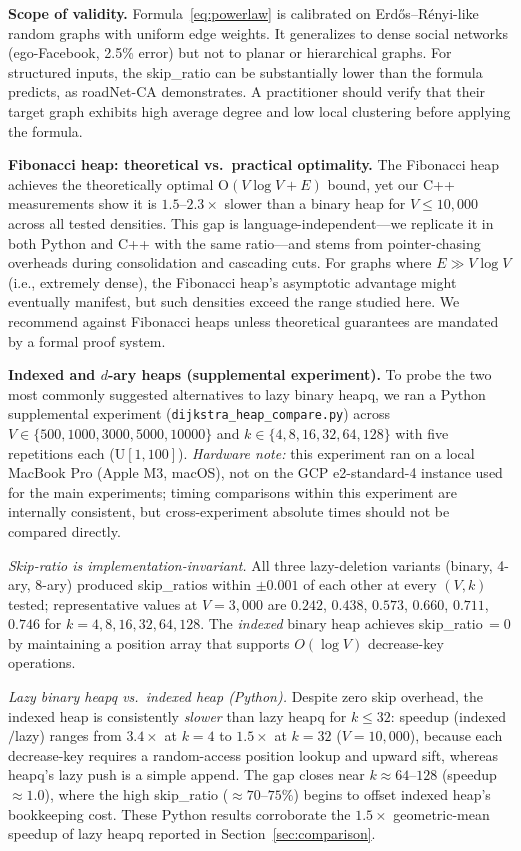 \documentclass[conference]{IEEEtran}
\begin{document}
\noindent\textbf{Scope of validity.}
Formula~\eqref{eq:powerlaw} is calibrated on Erd\H{o}s--R\'enyi-like
random graphs with uniform edge weights.  It generalizes to dense social
networks (ego-Facebook, 2.5\% error) but not to planar or hierarchical
graphs.  For structured inputs, the skip\_ratio can be substantially
lower than the formula predicts, as roadNet-CA demonstrates.  A
practitioner should verify that their target graph exhibits high average
degree and low local clustering before applying the formula.

\noindent\textbf{Fibonacci heap: theoretical vs.\ practical optimality.}
The Fibonacci heap achieves the theoretically optimal O$(V\log V + E)$
bound, yet our C++ measurements show it is $1.5$--$2.3\times$ slower
than a binary heap for $V\leq 10{,}000$ across all tested densities.
This gap is language-independent---we replicate it in both Python and C++
with the same ratio---and stems from pointer-chasing overheads during
consolidation and cascading cuts.  For graphs where $E\gg V\log V$
(i.e., extremely dense), the Fibonacci heap's asymptotic advantage might
eventually manifest, but such densities exceed the range studied here.
We recommend against Fibonacci heaps unless theoretical guarantees are
mandated by a formal proof system.

\noindent\textbf{Indexed and $d$-ary heaps (supplemental experiment).}
\label{sec:heapcompare}
To probe the two most commonly suggested alternatives to lazy binary heapq,
we ran a Python supplemental experiment (\texttt{dijkstra\_heap\_compare.py})
across $V\in\{500,1000,3000,5000,10000\}$ and $k\in\{4,8,16,32,64,128\}$
with five repetitions each ($\mathrm{U}[1,100]$).
\emph{Hardware note:} this experiment ran on a local MacBook Pro (Apple M3,
macOS), not on the GCP e2-standard-4 instance used for the main experiments;
timing comparisons within this experiment are internally consistent, but
cross-experiment absolute times should not be compared directly.

\textit{Skip-ratio is implementation-invariant.}
All three lazy-deletion variants (binary, 4-ary, 8-ary) produced
skip\_ratios within $\pm 0.001$ of each other at every $(V,k)$ tested;
representative values at $V=3{,}000$ are $0.242$, $0.438$, $0.573$,
$0.660$, $0.711$, $0.746$ for $k=4,8,16,32,64,128$.
The \emph{indexed} binary heap achieves skip\_ratio$\,=0$ by maintaining
a position array that supports $O(\log V)$ decrease-key operations.

\textit{Lazy binary heapq vs.\ indexed heap (Python).}
Despite zero skip overhead, the indexed heap is consistently \emph{slower}
than lazy heapq for $k\leq 32$: speedup (indexed$/$lazy) ranges from
$3.4\times$ at $k=4$ to $1.5\times$ at $k=32$ ($V=10{,}000$),
because each decrease-key requires a random-access position lookup and
upward sift, whereas heapq's lazy push is a simple append.
The gap closes near $k\approx 64$--$128$ (speedup $\approx 1.0$),
where the high skip\_ratio ($\approx70$--$75\%$) begins to offset indexed
heap's bookkeeping cost.  These Python results corroborate the
$1.5\times$ geometric-mean speedup of lazy heapq reported in
Section~\ref{sec:comparison}.
\end{document}
